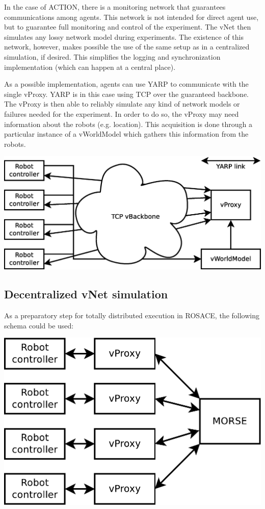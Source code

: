 \documentclass[a4paper,11pt]{article}
\begin{document}
In the case of ACTION, there is a monitoring network that guarantees communications among agents. This network is not intended for direct agent use, but to guarantee full monitoring and control of the experiment. The vNet then simulates any lossy network model during experiments. The existence of this network, however, makes possible the use of the same setup as in a centralized simulation, if desired. This simplifies the logging and synchronization implementation (which can happen at a central place).

As a possible implementation, agents can use YARP to communicate with the single vProxy. YARP is in this case using TCP over the guaranteed backbone. The vProxy is then able to reliably simulate any kind of network models or failures needed for the experiment. In order to do so, the vProxy may need information about the robots (e.g. location). This acquisition is done through a particular instance of a vWorldModel which gathers this information from the robots.

\begin{center}
\includegraphics[width=0.666\columnwidth]{figures/central+exp}
\end{center}

\subsection{Decentralized vNet simulation}

As a preparatory step for totally distributed execution in ROSACE, the following schema could be used:

\begin{center}
\includegraphics[width=0.666\columnwidth]{figures/distrib+morse}
\end{center}
\end{document}
